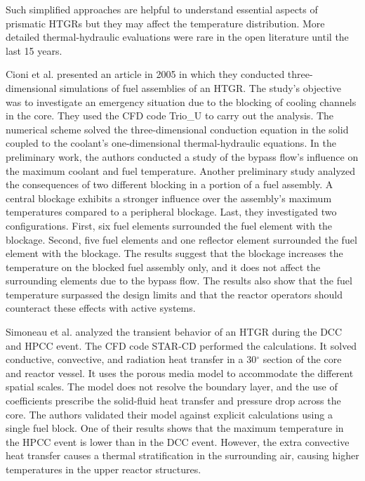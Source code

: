 Such simplified approaches are helpful to understand essential aspects of prismatic \glspl{HTGR} but they may affect the temperature distribution.
More detailed thermal-hydraulic evaluations were rare in the open literature until the last 15 years.

Cioni et al. \cite{cioni_3d_2005} presented an article in 2005 in which they conducted three-dimensional simulations of fuel assemblies of an \gls{HTGR}.
The study's objective was to investigate an emergency situation due to the blocking of cooling channels in the core.
They used the \gls{CFD} code Trio\_U \cite{bieder_priceles_2000} to carry out the analysis.
The numerical scheme solved the three-dimensional conduction equation in the solid coupled to the coolant's one-dimensional thermal-hydraulic equations.
In the preliminary work, the authors conducted a study of the bypass flow's influence on the maximum coolant and fuel temperature.
Another preliminary study analyzed the consequences of two different blocking in a portion of a fuel assembly.
A central blockage exhibits a stronger influence over the assembly's maximum temperatures compared to a peripheral blockage.
Last, they investigated two configurations.
First, six fuel elements surrounded the fuel element with the blockage.
Second, five fuel elements and one reflector element surrounded the fuel element with the blockage.
The results suggest that the blockage increases the temperature on the blocked fuel assembly only, and it does not affect the surrounding elements due to the bypass flow.
The results also show that the fuel temperature surpassed the design limits and that the reactor operators should counteract these effects with active systems.

Simoneau et al. \cite{simoneau_three-dimensional_2007} analyzed the transient behavior of an \gls{HTGR} during the \gls{DCC} and \gls{HPCC} event.
The CFD code STAR-CD \cite{computational_dynamics_limited_star-cd_2004} performed the calculations.
It solved conductive, convective, and radiation heat transfer in a 30$^{\circ}$ section of the core and reactor vessel.
It uses the porous media model to accommodate the different spatial scales.
The model does not resolve the boundary layer, and the use of coefficients prescribe the solid-fluid heat transfer and pressure drop across the core.
The authors validated their model against explicit calculations using a single fuel block.
One of their results shows that the maximum temperature in the \gls{HPCC} event is lower than in the \gls{DCC} event.
However, the extra convective heat transfer causes a thermal stratification in the surrounding air, causing higher temperatures in the upper reactor structures.

